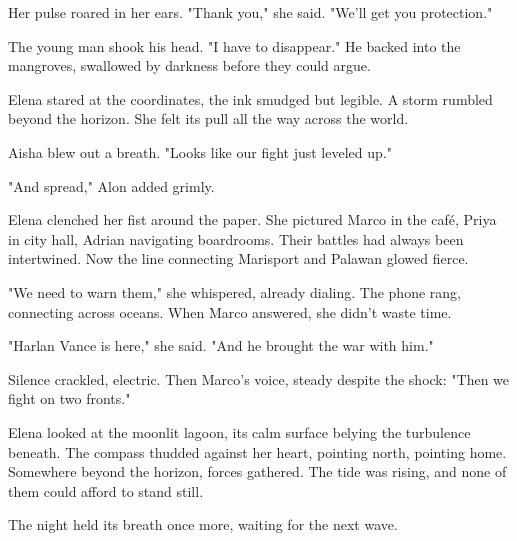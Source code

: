 Her pulse roared in her ears. "Thank you," she said. "We'll get you protection."

The young man shook his head. "I have to disappear." He backed into the mangroves, swallowed by darkness before they could argue.

Elena stared at the coordinates, the ink smudged but legible. A storm rumbled beyond the horizon. She felt its pull all the way across the world.

Aisha blew out a breath. "Looks like our fight just leveled up."

"And spread," Alon added grimly.

Elena clenched her fist around the paper. She pictured Marco in the café, Priya in city hall, Adrian navigating boardrooms. Their battles had always been intertwined. Now the line connecting Marisport and Palawan glowed fierce.

"We need to warn them," she whispered, already dialing. The phone rang, connecting across oceans. When Marco answered, she didn't waste time.

"Harlan Vance is here," she said. "And he brought the war with him."

Silence crackled, electric. Then Marco's voice, steady despite the shock: "Then we fight on two fronts."

Elena looked at the moonlit lagoon, its calm surface belying the turbulence beneath. The compass thudded against her heart, pointing north, pointing home. Somewhere beyond the horizon, forces gathered. The tide was rising, and none of them could afford to stand still.

The night held its breath once more, waiting for the next wave.
